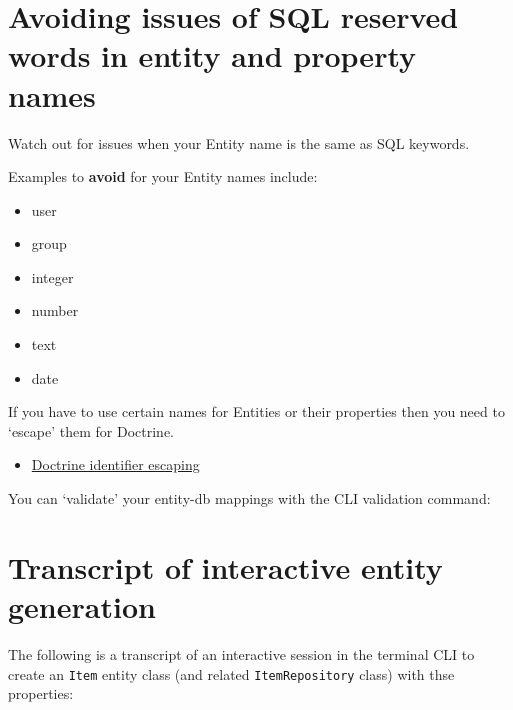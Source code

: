 \documentclass[a4paperpaper,openright]{book}
\newenvironment{Shaded}{}{}
\newcommand{\ExtensionTok}[1]{#1}
\newcommand{\NormalTok}[1]{#1}
\providecommand{\tightlist}{%
  \setlength{\itemsep}{0pt}\setlength{\parskip}{0pt}}
\begin{document}
\hypertarget{avoiding-issues-of-sql-reserved-words-in-entity-and-property-names}{%
\chapter{Avoiding issues of SQL reserved words in entity and property
names}\label{avoiding-issues-of-sql-reserved-words-in-entity-and-property-names}}

Watch out for issues when your Entity name is the same as SQL keywords.

Examples to \textbf{avoid} for your Entity names include:

\begin{itemize}
\tightlist
\item
  user
\item
  group
\item
  integer
\item
  number
\item
  text
\item
  date
\end{itemize}

If you have to use certain names for Entities or their properties then
you need to `escape' them for Doctrine.

\begin{itemize}
\tightlist
\item
  \href{http://docs.doctrine-project.org/projects/doctrine-orm/en/latest/reference/basic-mapping.html\#quoting-reserved-words}{Doctrine
  identifier escaping}
\end{itemize}

You can `validate' your entity-db mappings with the CLI validation
command:

\begin{Shaded}
\end{Shaded}

\hypertarget{transcript-of-interactive-entity-generation}{%
\chapter{\texorpdfstring{Transcript of interactive entity generation
\label{appendix_entity_gen}}{Transcript of interactive entity generation }}\label{transcript-of-interactive-entity-generation}}

The following is a transcript of an interactive session in the terminal
CLI to create an \texttt{Item} entity class (and related
\texttt{ItemRepository} class) with thse properties:
\end{document}
